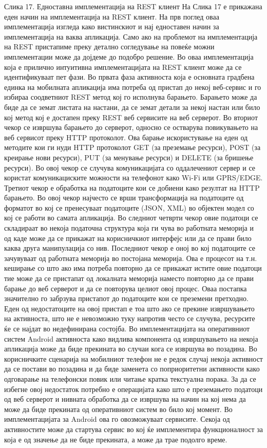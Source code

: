 Слика 17. Едноставна имплементација на REST клиент На Слика 17 е прикажана еден
начин на имплементација на REST клиент. На прв поглед оваа имплементација
изгледа како вистинскиот и нај едноставен начин за имплементација на ваква
апликација. Само ако на проблемот на имплементација на REST пристапиме преку
детално согледување на повеќе можни имплементации може да дојдеме до подобро
решение. Во оваа имплементација која е прилично интуитивна имплементацијата на
REST клиент може да се идентификуваат пет фази. Во првата фаза активноста која е
основната градбена единка на мобилната апликација има потреба од пристап до
некој веб-сервис и го избираа соодветниот REST метод кој го исполнува барањето.
Барањето може да биде да се земат листата на настани, да се земат детали за
некој настан или било кој метод кој е достапен преку REST веб сервисите на веб
серверот. Во вториот чекор се извршува барањето до серверот, односно се
остварува повикувањето на веб сервисот преку HTTP протоколот. Ова барање
искористување на еден од методите кои ги нуди HTTP протоколот GET (за преземање
ресурси), POST (за креирање нови ресурси), PUT (за менување ресурси) и DELETE
(за бришење ресурси). Во овој чекор се случува комуникацијата со оддалечениот
сервер и се користат комуникациските можности на телефонот како Wi-Fi или
GPRS/EDGE. Третиот чекор е обработка на податоците кои се добиени како резултат
на HTTP барањето. Во овој чекор најчесто се врши трансформација на податоците од
форматот во кој се пренесуваат податоците (JSON, XML) во објектен модел со кој
се работи во самата апликација. Во следниот четврти чекор овие податоци се
складираат во некоја податочна структура која ги чува во работната меморија и од
каде може да се прикажат на корисничкиот интерфејс или да се прави било каква
друга манипулација со нив. Последниот чекор е оној во кој податоците се
зачувуваат од работната меморија во постојана меморија. Ова е процесот на т.н.
кеширање со што ако има потреба повторно да се прикажат истите овие податоци тие
може да се пристапат од локалната меморија наместо повторно да се прави барање
до веб серверот и да се повторува целиот овој процес. Оваа постапка значително
го забрзува пристапот до податоците кои се преземени претходно. Еден од
недостатоците на овој пристап е тоа што ако се прекине извршувањето на
активноста, што не е невозможно туку напротив често се случува, ресурсите ќе се
најдат во недефинирана состојба. Во имплементацијата на оперативниот систем
Android активноста како видлива компонента од извршувањето на некоја апликација
може да биде прекината во случаи кога се извршува во позадина. Во корисничките
сценарија на мобилниот телефон не е редок случај некоја активност да се постави
во позадина и да биде заменета со поприоритетни активности како одговарање на
телефонски повик или читање кратка текстуална порака. За да се избегне овој
недостаток потребно е операцијата како што е преземањето податоци од веб
серверот и нивната обработка да се извршува на начин на кој нема да може да биде
прекината од оперативниот систем во било кој момент. Во имплементацијата за
Android ова го овозможуваат сервисите. Секоја од активностите може да стартува
сервис во кој ќе имплементира функционалност за која е од значење да не биде
прекината, а може да трае подолго време.
 
